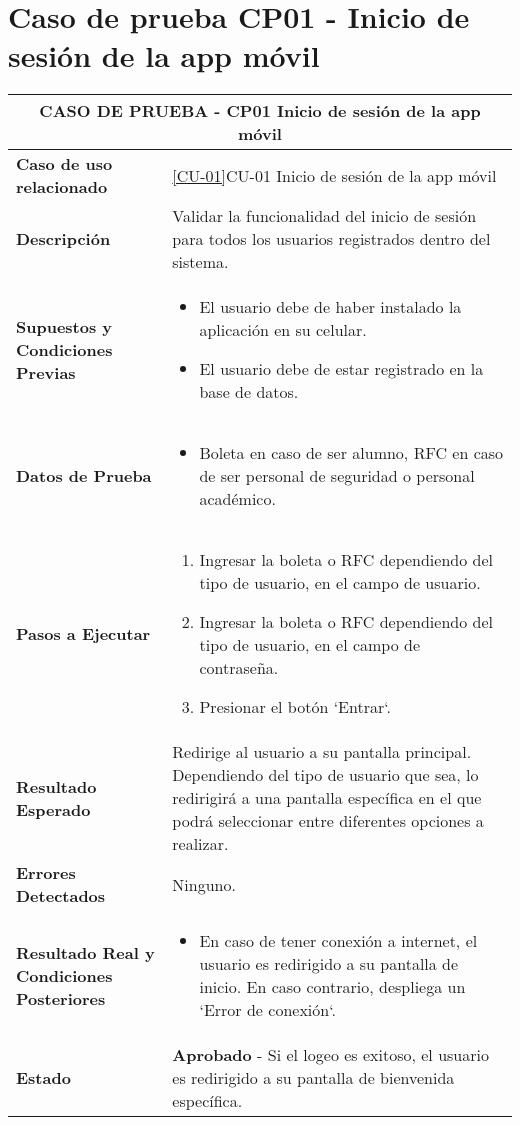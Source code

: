 
\section{Caso de prueba CP01 - Inicio de sesión de la app móvil}

\begin{longtable}{|p{5cm}|p{10cm}|}
	\hline
	\multicolumn{2}{|c|}{\textbf{CASO DE PRUEBA - CP01 Inicio de sesión de la app móvil}} \\
	\hline
	\textbf{Caso de uso relacionado} & \ref{CU-01}{CU-01} Inicio de sesión de la app móvil \\
	\hline
	\textbf{Descripción} & Validar la funcionalidad del inicio de sesión para todos los usuarios registrados dentro del sistema. \\
	\hline
	\textbf{Supuestos y Condiciones Previas} & 
	\begin{itemize}
		\item El usuario debe de haber instalado la aplicación en su celular.
		\item El usuario debe de estar registrado en la base de datos.
	\end{itemize} \\
	\hline
	\textbf{Datos de Prueba} & 
	\begin{itemize}
		\item Boleta en caso de ser alumno, RFC en caso de ser personal de seguridad o personal académico.
	\end{itemize} \\
	\hline
	\textbf{Pasos a Ejecutar} & 
	\begin{enumerate}
		\item Ingresar la boleta o RFC dependiendo del tipo de usuario, en el campo de usuario.
		\item Ingresar la boleta o RFC dependiendo del tipo de usuario, en el campo de contraseña.
		\item Presionar el botón `Entrar`.
	\end{enumerate} \\
	\hline
	\textbf{Resultado Esperado} & 
	Redirige al usuario a su pantalla principal. Dependiendo del tipo de usuario que sea, lo redirigirá a una pantalla específica en el que podrá seleccionar entre diferentes opciones a realizar. \\
	\hline
	\textbf{Errores Detectados} & 
	Ninguno. \\
	\hline
	\textbf{Resultado Real y Condiciones Posteriores} & 
	\begin{itemize}
		\item En caso de tener conexión a internet, el usuario es redirigido a su pantalla de inicio. En caso contrario, despliega un `Error de conexión`.
	\end{itemize} \\
	\hline
	\textbf{Estado} & 
	\textbf{Aprobado} - Si el logeo es exitoso, el usuario es redirigido a su pantalla de bienvenida específica.   \\
	\hline
\end{longtable}